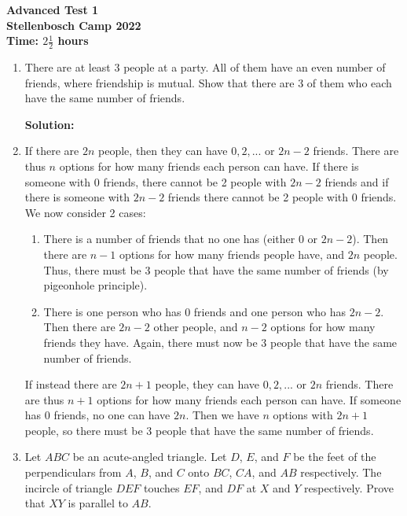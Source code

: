 \documentclass{article}
\begin{document}
\thispagestyle{empty}

\begin{center}
  \textbf{\Large Advanced Test 1}
  \\ \vspace{1em}
  \textbf{\large Stellenbosch Camp 2022}
  \\ \vspace{1em}
  \textbf{\large Time: $2\frac{1}{2}$ hours}
\end{center}

\bigskip

\begin{enumerate}[itemsep=\fill]


\item %
There are at least 3 people at a party. All of them have an even number of friends, where friendship is mutual. Show that there are 3 of them who each have the same number of friends.

\textbf{Solution:} \item If there are $2n$ people, then they can have $0,2,...$ or $2n-2$ friends. There are thus $n$ options for how many friends each person can have. If there is someone with 0 friends, there cannot be 2 people with $2n-2$ friends and if there is someone with $2n-2$ friends there cannot be 2 people with 0 friends. We now consider 2 cases:
\begin{enumerate}
\item There is a number of friends that no one has (either 0 or $2n-2$). Then there are $n-1$ options for how many friends people have, and $2n$ people. Thus, there must be 3 people that have the same number of friends (by pigeonhole principle).
\item There is one person who has 0 friends and one person who has $2n-2$. Then there are $2n-2$ other people, and $n-2$ options for how many friends they have. Again, there must now be 3 people that have the same number of friends.
\end{enumerate}
If instead there are $2n+1$ people, they can have $0,2,...$ or $2n$ friends. There are thus $n+1$ options for how many friends each person can have. If someone has 0 friends, no one can have $2n$. Then we have $n$ options with $2n+1$ people, so there must be 3 people that have the same number of friends.


\item %
Let $ABC$ be an acute-angled triangle. Let $D$, $E$, and $F$ be the feet of the perpendiculars from $A$, $B$, and $C$ onto $BC$, $CA$, and $AB$ respectively. The incircle of triangle $DEF$ touches $EF$, and $DF$ at $X$ and $Y$ respectively. Prove that $XY$ is parallel to $AB$.


\end{enumerate}
\end{document}
